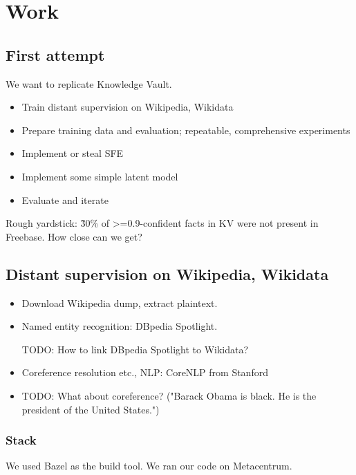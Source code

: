 \chapter{Work}

\section{First attempt}

We want to replicate Knowledge Vault.
\begin{itemize}
\item Train distant supervision on Wikipedia, Wikidata
\item Prepare training data and evaluation; repeatable, comprehensive
experiments
\item Implement or steal SFE
\item Implement some simple latent model
\item Evaluate and iterate
\end{itemize}
Rough yardstick: \~30\% of >=0.9-confident facts in KV were not present in
Freebase. How close can we get?

\section{Distant supervision on Wikipedia, Wikidata}

\begin{itemize}
\item Download Wikipedia dump, extract plaintext.
\item Named entity recognition: DBpedia Spotlight\cite{dbpedia-spotlight}.

	TODO: How to link DBpedia Spotlight to Wikidata?

\item Coreference resolution etc., NLP: CoreNLP from Stanford\cite{stanford-corenlp}

\item TODO: What about coreference? ("Barack Obama is black. He is the
president of the United States.")
\end{itemize}

\subsection{Stack}

We used Bazel as the build tool. We ran our code on Metacentrum.
